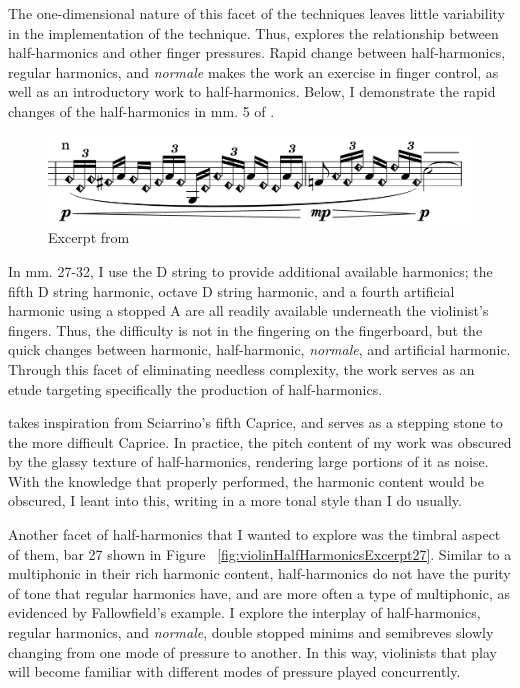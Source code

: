 The one-dimensional nature of this facet of the techniques leaves little variability in the implementation of the technique. 
Thus, \violinPiece explores the relationship between half-harmonics and other finger pressures. 
Rapid change between half-harmonics, regular harmonics, and \emph{normale} makes the work an exercise in finger control, as well as an introductory work to half-harmonics.
Below, I demonstrate the rapid changes of the half-harmonics in mm. 5 of \violinPiece.

\begin{figure}
    \includegraphics[width=\linewidth]{./resources/violinHalfHarmonicsExcerpt5.pdf}
    \caption{Excerpt from \violinPiece}
  \label{fig:Excerpt from what are you doing with the humans, mm. 5}
  \end{figure}

In mm. 27-32, I use the D string to provide additional available harmonics; the fifth D string harmonic, octave D string harmonic, and a fourth artificial harmonic using a stopped A are all readily available underneath the violinist's fingers.
Thus, the difficulty is not in the fingering on the fingerboard, but the quick changes between harmonic, half-harmonic, \emph{normale}, and artificial harmonic.
Through this facet of eliminating needless complexity, the work serves as an etude targeting specifically the production of half-harmonics.

\violinPiece takes inspiration from Sciarrino's fifth Caprice, and serves as a stepping stone to the more difficult Caprice.\autocite[]{sciarrinoCapricciViolino1976} 
In practice, the pitch content of my work was obscured by the glassy texture of half-harmonics, rendering large portions of it as noise. 
With the knowledge that properly performed, the harmonic content would be obscured, I leant into this, writing in a more tonal style than I do usually.

Another facet of half-harmonics that I wanted to explore was the timbral aspect of them, bar 27 shown in Figure ~\ref{fig:violinHalfHarmonicsExcerpt27}.
Similar to a multiphonic in their rich harmonic content, half-harmonics do not have the purity of tone that regular harmonics have, and are more often a type of multiphonic, as evidenced by Fallowfield's example.
I explore the interplay of half-harmonics, regular harmonics, and \emph{normale}, double stopped minims and semibreves slowly changing from one mode of pressure to another.
In this way, violinists that play \violinPiece will become familiar with different modes of pressure played concurrently.

